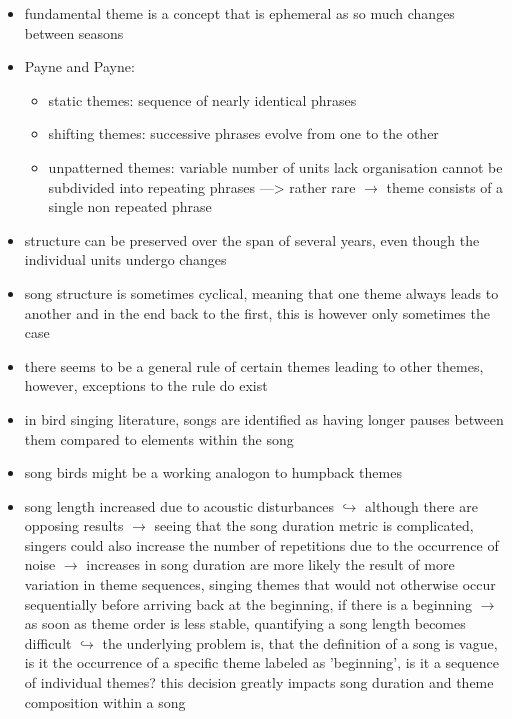 \documentclass[12pt,a4paper]{article}
\begin{document}
\begin{itemize}
  \item fundamental theme is a concept that is ephemeral as so much changes between seasons
  \item Payne and Payne:
  \begin{itemize} 
    \item static themes:       sequence of nearly identical phrases
    \item shifting themes:     successive phrases evolve from one to the other
    \item unpatterned themes:  variable number of units lack organisation cannot be subdivided into repeating phrases  ---> rather rare
      \newline \indent $\longrightarrow$ theme consists of a single non repeated phrase
  \end{itemize}
  \item structure can be preserved over the span of several years, even though the individual units undergo changes
  \item song structure is sometimes cyclical, meaning that one theme always leads to another and in the end back to the first, this is however only sometimes the case
  \item there seems to be a general rule of certain themes leading to other themes, however, exceptions to the rule do exist
  \item in bird singing literature, songs are identified as having longer pauses between them compared to elements within the song
  \item song birds might be a working analogon to humpback themes
  \item song length increased due to acoustic disturbances 
  \newline \indent $\hookrightarrow$ although there are opposing results
  \newline \indent $\longrightarrow$ seeing that the song duration metric is complicated, singers could also increase the number of repetitions due to the occurrence of noise
  \newline \indent $\longrightarrow$ increases in song duration are more likely the result of more variation in theme sequences, singing themes that would not otherwise occur sequentially before arriving back at the beginning, if there is a beginning
  \newline \indent $\longrightarrow$ as soon as theme order is less stable, quantifying a song length becomes difficult
  \newline \indent $\hookrightarrow$ the underlying problem is, that the definition of a song is vague, is it the occurrence of a specific theme labeled as 'beginning', is it a sequence of individual themes? this decision greatly impacts song duration and theme composition within a song

\end{itemize}
\end{document}
